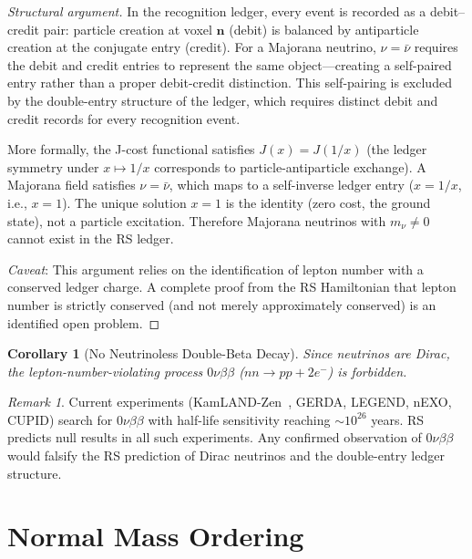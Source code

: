 \documentclass[12pt,a4paper]{article}
\newtheorem{corollary}[theorem]{Corollary}
\theoremstyle{definition}
\theoremstyle{remark}
\newtheorem{remark}[theorem]{Remark}
\begin{document}
\begin{proof}[Structural argument]
In the recognition ledger, every event is recorded as a
debit--credit pair: particle creation at voxel
$\mathbf{n}$ (debit) is balanced by antiparticle creation
at the conjugate entry (credit).  For a Majorana neutrino,
$\nu = \bar{\nu}$ requires the debit and credit entries
to represent the same object---creating a self-paired entry
rather than a proper debit-credit distinction.  This
self-pairing is excluded by the double-entry structure of the
ledger, which requires distinct debit and credit records
for every recognition event.

More formally, the J-cost functional satisfies
$J(x) = J(1/x)$ (the ledger symmetry under
$x \mapsto 1/x$ corresponds to particle-antiparticle
exchange).  A Majorana field satisfies $\nu = \bar{\nu}$,
which maps to a self-inverse ledger entry ($x = 1/x$,
i.e., $x = 1$).  The unique solution $x = 1$ is the
identity (zero cost, the ground state), not a
particle excitation.  Therefore Majorana neutrinos with
$m_\nu \neq 0$ cannot exist in the RS ledger.

\emph{Caveat}: This argument relies on the identification
of lepton number with a conserved ledger charge.  A
complete proof from the RS Hamiltonian that lepton number
is strictly conserved (and not merely approximately
conserved) is an identified open problem.
\end{proof}

\begin{corollary}[No Neutrinoless Double-Beta Decay]
\label{cor:0nubb}
Since neutrinos are Dirac, the lepton-number-violating process
$0\nu\beta\beta$ ($nn \to pp + 2e^-$) is forbidden.
\end{corollary}

\begin{remark}
Current experiments (KamLAND-Zen~\cite{KamLAND}, GERDA,
LEGEND, nEXO, CUPID) search for $0\nu\beta\beta$ with
half-life sensitivity reaching $\sim 10^{26}$ years.  RS
predicts null results in all such experiments.  Any confirmed
observation of $0\nu\beta\beta$ would falsify the RS
prediction of Dirac neutrinos and the double-entry ledger
structure.
\end{remark}

\section{Normal Mass Ordering}
\label{sec:ordering}
\end{document}
